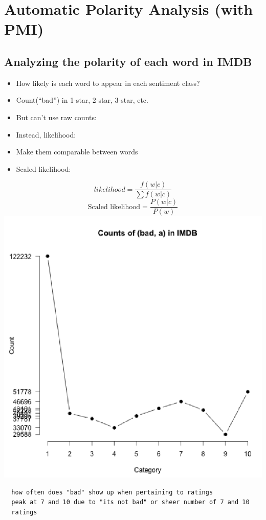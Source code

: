 \documentclass[11pt]{article}
\theoremstyle{definition}
\begin{document}
\section{Automatic Polarity
Analysis (with PMI)}

\subsection{Analyzing the polarity of each word in IMDB}
\begin{itemize}
  \item How likely is each word to appear in each sentiment class?
  \item Count(“bad”) in 1-star, 2-star, 3-star, etc.
  \item But can’t use raw counts:
  \item Instead, likelihood:
  \item Make them comparable between words
  \item Scaled likelihood:
\end{itemize}
\begin{equation}
  likelihood = \frac{f(w|c)}{\sum f(w|c)}
\end{equation}
\begin{equation}
  \text{Scaled likelihood} = \frac{P(w|c)}{P(w)}
\end{equation}
\includegraphics[width=\textwidth/4]{15.png}
\begin{verbatim}
  how often does "bad" show up when pertaining to ratings
  peak at 7 and 10 due to "its not bad" or sheer number of 7 and 10 
  ratings
\end{verbatim}
\end{document}
